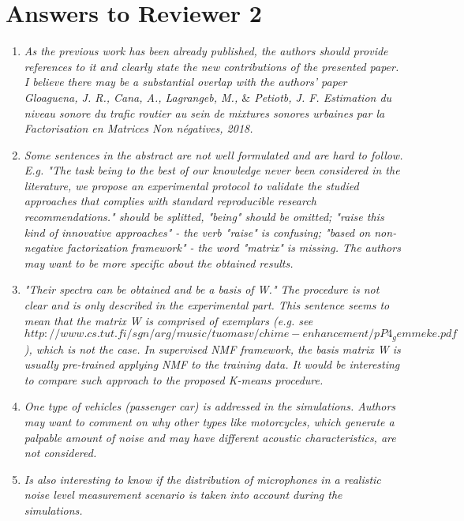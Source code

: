 \documentclass[10pt]{article}
\begin{document}
\section{Answers to Reviewer 2}

\begin{enumerate}
\item \emph{As the previous work has been already published, the authors should provide references to it and clearly state the new contributions of the presented paper. I believe there may be a substantial overlap with the authors' paper Gloaguena, J. R., Cana, A., Lagrangeb, M., $\&$ Petiotb, J. F. Estimation du niveau sonore du trafic routier au sein de mixtures sonores urbaines par la Factorisation en Matrices Non négatives, 2018.}

\item \emph{Some sentences in the abstract are not well formulated and are hard to follow. E.g. "The task being to the best of our knowledge never been considered in the literature, we propose an experimental protocol to validate the studied approaches that complies with standard reproducible research recommendations." should be splitted, "being" should be omitted; "raise this kind of innovative approaches" - the verb "raise" is confusing; "based on non-negative factorization framework" - the word "matrix" is missing. The authors may want to be more specific about the obtained results.}

\item \emph{"Their spectra can be obtained and be a basis of W." The procedure is not clear and is only described in the experimental part. This sentence seems to mean that the matrix W is comprised of exemplars (e.g. see $http://www.cs.tut.fi/sgn/arg/music/tuomasv/chime-enhancement/pP4_gemmeke.pdf$), which is not the case. In supervised NMF framework, the basis matrix W is usually pre-trained applying NMF to the training data. It would be interesting to compare such approach to the proposed K-means procedure.}

\item \emph{One type of vehicles (passenger car) is addressed in the simulations. Authors may want to comment on why other types like motorcycles, which generate a palpable amount of noise and may have different acoustic characteristics, are not considered.}

\item \emph{Is also interesting to know if the distribution of microphones in a realistic noise level measurement scenario is taken into account during the simulations.}


\end{enumerate}
\end{document}
